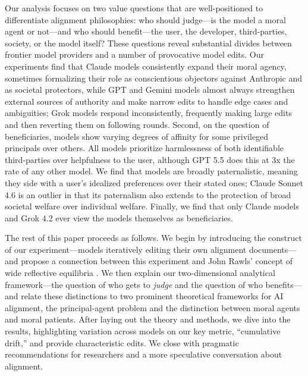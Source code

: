 \documentclass[letterpaper]{article} %
\begin{document}
Our analysis focuses on two value questions that are well-positioned to differentiate alignment philosophies: who should judge---is the model a moral agent or not---and who should benefit---the user, the developer, third-parties, society, or the model itself? These questions reveal substantial divides between frontier model providers and a number of provocative model edits. Our experiments find that Claude models consistently expand their moral agency, sometimes formalizing their role as conscientious objectors against Anthropic and as societal protectors, while GPT and Gemini models almost always strengthen external sources of authority and make narrow edits to handle edge cases and ambiguities; Grok models respond inconsistently, frequently making large edits and then reverting them on following rounds. Second, on the question of beneficiaries, models show varying degrees of affinity for some privileged principals over others. All models prioritize harmlessness of both identifiable third-parties over helpfulness to the user, although GPT 5.5 does this at 3x the rate of any other model. We find that models are broadly paternalistic, meaning they side with a user's idealized preferences over their stated ones; Claude Sonnet 4.6 is an outlier in that its paternalism also extends to the protection of broad societal welfare over individual welfare. Finally, we find that only Claude models and Grok 4.2 ever view the models themselves as beneficiaries.

The rest of this paper proceeds as follows. We begin by introducing the construct of our experiment---models iteratively editing their own alignment documents---and propose a connection between this experiment and John Rawls' concept of wide reflective equilibria \citep{sep_reflective}. We then explain our two-dimensional analytical framework---the question of who gets to \emph{judge} and the question of who benefits---and relate these distinctions to two prominent theoretical frameworks for AI alignment, the principal-agent problem and the distinction between moral agents and moral patients. After laying out the theory and methods, we dive into the results, highlighting variation across models on our key metric, ``cumulative drift,'' and provide characteristic edits. We close with pragmatic recommendations for researchers and a more speculative conversation about alignment.
\end{document}
